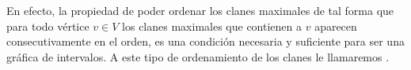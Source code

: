 En efecto, la propiedad de poder ordenar los clanes maximales de tal forma que
para todo vértice $v\in V$ los clanes maximales que contienen a $v$ aparecen
consecutivamente en el orden, es una condición necesaria y suficiente para ser
una gráfica de intervalos. A este tipo de ordenamiento de los clanes le
llamaremos .

